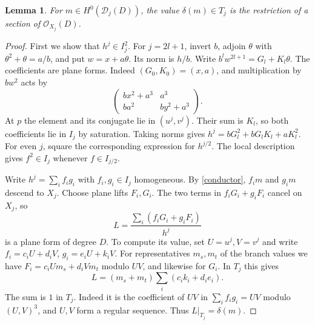 \documentclass[11pt,a4paper,reqno]{amsart}
\numberwithin{equation}{section}
\theoremstyle{plain}
\newtheorem{lemma}[theorem]{Lemma}
\newcommand{\OO}{\mathcal O}
\newcommand{\Dcal}{\mathcal D}
\begin{document}
\begin{lemma}\label{common}
For $m\in H^0(\Dcal_j(D))$, the value $\delta(m)\in T_j$ is the restriction of a section of $\OO_{X_j}(D)$.
\end{lemma}
\begin{proof}
First we show that $h^j\in I_j^2$. For $j=2l+1$, invert $b$, adjoin $\theta$ with $\theta^2+\theta=a/b$, and put $w=x+a\theta$. Its norm is $h/b$. Write $b^l w^{2l+1}=G_l+K_l\theta$. The coefficients are plane forms. Indeed $(G_0,K_0)=(x,a)$, and multiplication by $bw^2$ acts by
\[
 \begin{pmatrix}bx^2+a^3&a^3\\ba^2&by^2+a^3\end{pmatrix}.
\]
At $p$ the element and its conjugate lie in $(u^j,v^j)$. Their sum is $K_l$, so both coefficients lie in $I_j$ by saturation. Taking norms gives $h^j=bG_l^2+bG_lK_l+aK_l^2$. For even $j$, square the corresponding expression for $h^{j/2}$. The local description gives $f^2\in I_j$ whenever $f\in I_{j/2}$.

Write $h^j=\sum_i f_i g_i$ with $f_i,g_i\in I_j$ homogeneous. By \eqref{conductor}, $f_i m$ and $g_i m$ descend to $X_j$. Choose plane lifts $F_i,G_i$. The two terms in $f_iG_i+g_iF_i$ cancel on $X_j$, so
\[
 L=\frac{\sum_i (f_iG_i+g_iF_i)}{h^j}
\]
is a plane form of degree $D$. To compute its value, set $U=u^j,V=v^j$ and write $f_i=c_iU+d_iV$, $g_i=e_iU+k_iV$. For representatives $m_s,m_t$ of the branch values we have $F_i=c_iUm_s+d_iVm_t$ modulo $UV$, and likewise for $G_i$. In $T_j$ this gives
\[
 L=(m_s+m_t)\sum_i(c_i k_i+d_i e_i).
\]
The sum is $1$ in $T_j$. Indeed it is the coefficient of $UV$ in $\sum_i f_i g_i=UV$ modulo $(U,V)^3$, and $U,V$ form a regular sequence. Thus $L|_{T_j}=\delta(m)$.
\end{proof}
\end{document}
